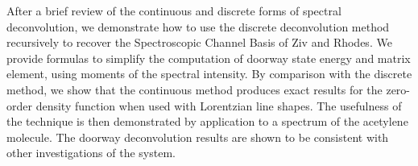 After a brief review of the continuous and discrete forms of spectral
deconvolution, we demonstrate how to use the discrete deconvolution
method recursively to recover the Spectroscopic Channel Basis of Ziv
and Rhodes.  We provide formulas to simplify the computation of
doorway state energy and matrix element, using moments of the spectral
intensity.  By comparison with the discrete method, we show that the
continuous method produces exact results for the zero-order density
function %
when used with Lorentzian line shapes.
The usefulness of
the technique is then demonstrated by application to a spectrum of the
acetylene molecule.  The doorway deconvolution results are shown to be
consistent with other investigations of the system.

